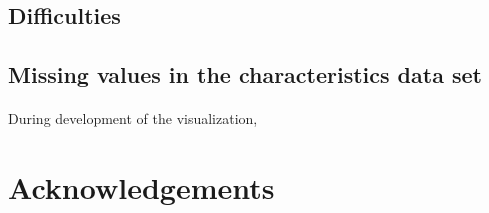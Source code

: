 \documentclass[12pt, a4paper]{article}
\begin{document}
			\paragraph{}
		\subsection{Difficulties}
			\paragraph{}
		\subsection{Missing values in the characteristics data set}
			\paragraph{}
				During development of the visualization, %
	\section{Acknowledgements}
\end{document}

